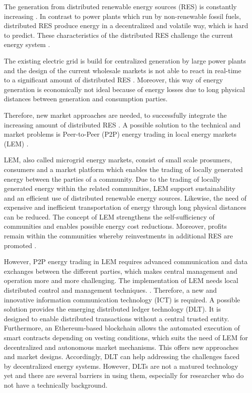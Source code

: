 
The generation from distributed renewable energy sources (RES) is constantly increasing \cite{mengelkamp2018designing}. In contrast to power plants which run by non-renewable fossil fuels, distributed RES produce energy in a decentralized and volatile way, which is hard to predict. These characteristics of the distributed RES challenge the current energy system \cite{ampatzis2014local}.

The existing electric grid is build for centralized generation by large power plants and the design of the current wholesale markets is not able to react in real-time to a significant amount of distributed RES \cite{mengelkamp2018designing} \cite{ampatzis2014local}. Moreover, this way of energy generation is economically not ideal because of energy losses due to long physical distances between generation and consumption parties. 

Therefore, new market approaches are needed, to successfully integrate the increasing amount of distributed RES \cite{mengelkamp2018blockchain}. A possible solution to the technical and market problems is Peer-to-Peer (P2P) energy trading in local energy markets (LEM) \cite{long2017feasibility}. 

LEM, also called microgrid energy markets, consist of small scale prosumers, consumers and a market platform which enables the trading of locally generated energy between the parties of a community. Due to the trading of locally generated energy within the related communities, LEM support sustainability and an efficient use of distributed renewable energy sources. Likewise, the need of expensive and inefficient transportation of energy through long physical distances can be reduced. The concept of LEM strengthens the self-sufficiency of communities and enables possible energy cost reductions. Moreover, profits remain within the communities whereby reinvestments in additional RES are promoted \cite{mengelkamp2018designing}. 

However, P2P energy trading in LEM requires advanced communication and data exchanges between the different parties, which makes central management and operation more and more challenging. The implementation of LEM needs local distributed control and management techniques. \cite{andoni2019blockchain}. Therefore, a new and innovative information communication technology (ICT) is required.  A possible solution provides the emerging distributed ledger technology (DLT). It is designed to enable distributed transactions without a central trusted entity. Furthermore, an Ethereum-based blockchain allows the automated execution of smart contracts depending on vesting conditions, which suits the need of LEM for decentralized and autonomous market mechanisms. This offers new approaches and market designs. Accordingly, DLT can help addressing the challenges faced by decentralized energy systems. However, DLTs are not a matured technology yet and there are several barriers in using them, especially for researcher who do not have a technically background. 

